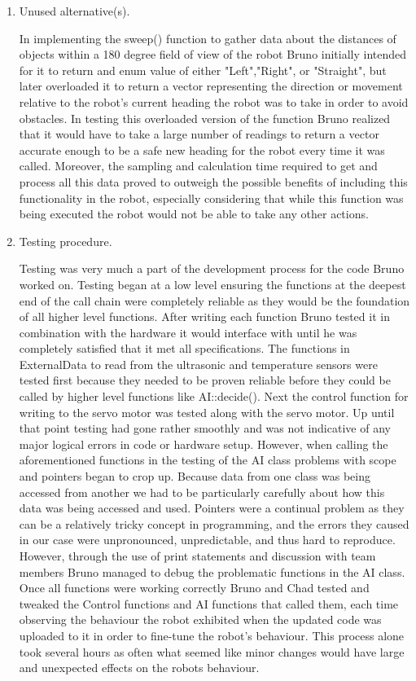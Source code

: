 \documentclass[letterpaper,12pt]{article}
\begin{document}
\begin{enumerate}
\item Unused alternative(s). 

In implementing the sweep() function to gather data about the distances of objects within a 180 degree field of view of the robot Bruno initially intended for it to return and enum value of either "Left","Right", or "Straight", but later overloaded it to return a vector representing the direction or movement relative to the robot's current heading the robot was to take in order to avoid obstacles. In testing this overloaded version of the function Bruno realized that it would have to take a large number of readings to return a vector accurate enough to be a safe new heading for the robot every time it was called. Moreover, the sampling and calculation time required to get and process all this data proved to outweigh the possible benefits of including this functionality in the robot, especially considering that while this function was being executed the robot would not be able to take any other actions.

\item Testing procedure. 

Testing was very much a part of the development process for the code Bruno worked on. Testing began at a low level ensuring the functions at the deepest end of the call chain were completely reliable as they would be the foundation of all higher level functions. After writing each function Bruno tested it in combination with the hardware it would interface with until he was completely satisfied that it met all specifications. The functions in ExternalData to read from the ultrasonic and temperature sensors were tested first because they needed to be proven reliable before they could be called by higher level functions like AI::decide(). Next the control function for writing to the servo motor was tested along with the servo motor. Up until that point testing had gone rather smoothly and was not indicative of any major logical errors in code or hardware setup. However, when calling the aforementioned functions in the testing of the AI class problems with scope and pointers began to crop up. Because data from one class was being accessed from another we had to be particularly carefully about how this data was being accessed and used. Pointers were a continual problem as they can be a relatively tricky concept in programming, and the errors they caused in our case were unpronounced, unpredictable, and thus hard to reproduce. However, through the use of print statements and discussion with team members Bruno managed to debug the problematic functions in the AI class. Once all functions were working correctly Bruno and Chad tested and tweaked the Control functions and AI functions that called them, each time observing the behaviour the robot exhibited when the updated code was uploaded to it in order to fine-tune the robot's behaviour. This process alone took several hours as often what seemed like minor changes would have large and unexpected effects on the robots behaviour. 
   

\end{enumerate}
\end{document}

